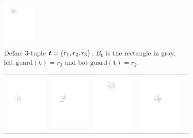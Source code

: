 \documentclass[sigconf]{acmart}
\def\figcapup{\vspace{-0mm}}
\def\figcapdown{\vspace{-0mm}}
\def\gleft{\mathrm{left\text{-}guard}}
\def\gbot{\mathrm{bot\text{-}guard}}
\begin{document}
\begin{figure}
    \includegraphics[height=23mm]{./artwork/guard}

    \figcapup
    \caption{Define 3-tuple $\textrm{\boldmath${t}$} = \{r_1, r_2, r_3\}$. $B_\bm{t}$ is the rectangle in gray, $\gleft(\bm{t}) = r_3$ and $\gbot(\bm{t}) = r_2$.}
    \label{fig:guard}
    \figcapdown
\end{figure}


\begin{figure}
    \begin{tabular}{ccccc}
        \includegraphics[height=30mm]{./artwork/prob-a} & 
        \hspace{3mm}
        \includegraphics[height=27mm]{./artwork/prob-b} &
        \hspace{3mm}
        \includegraphics[height=30mm]{./artwork/prob-c} &
        \hspace{3mm}
        \includegraphics[height=30mm]{./artwork/prob-d} &
        \hspace{3mm}

\end{tabular}
\end{figure}
\end{document}
